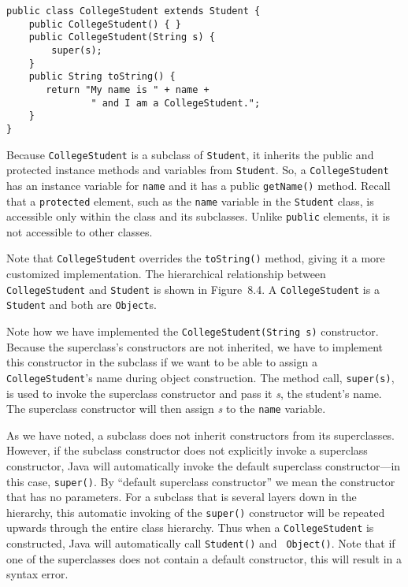 \begin{jjjlisting}
\begin{lstlisting}
public class CollegeStudent extends Student {
    public CollegeStudent() { }
    public CollegeStudent(String s) {
        super(s);
    }
    public String toString() {
       return "My name is " + name +  
               " and I am a CollegeStudent.";
    }
}
\end{lstlisting}
\end{jjjlisting}

\noindent Because {\tt CollegeStudent} is a subclass of {\tt Student},
it inherits the public and protected instance methods and variables
from {\tt Student}. So, a {\tt CollegeStudent} has an instance
variable for {\tt name} and it has a public {\tt getName()}
method. Recall that a {\tt protected} element, such as the {\tt name}
variable in the {\tt Student} class, is accessible only within the
class and its subclasses. Unlike {\tt public} elements, it is not
accessible to other classes.

Note that {\tt CollegeStudent} overrides the {\tt toString()} method,
giving it a more customized implementation.  The hierarchical
relationship between {\tt CollegeStudent} and {\tt Student} is shown
in Figure~8.4.  A {\tt CollegeStudent} is a {\tt Student} and both
are {\tt Object}s. 

Note how we have implemented the {\tt CollegeStudent(String s)}
constructor. Because the superclass's constructors are not inherited,
we have to implement this constructor in the subclass if we want to be
able to assign a {\tt CollegeStudent}'s name during object
construction.  The method call, {\tt super(s)}, is used to invoke the
superclass constructor and pass it {\em s}, the student's name. The
superclass constructor will then assign {\em s} to the {\tt name}
variable.

As we have noted, a subclass does not inherit constructors from its
 superclasses.  However, if the
subclass constructor does not explicitly invoke a superclass
constructor, Java will automatically invoke the default superclass
constructor---in this case, {\tt super()}.  By ``default superclass
constructor'' we mean the constructor that has no parameters.  For a
subclass that is several layers down in the hierarchy, this automatic
invoking of the {\tt super()} constructor will be repeated upwards
through the entire class hierarchy.  Thus when a {\tt CollegeStudent}
is constructed, Java will automatically call {\tt Student()} and {\tt
Object()}.  Note that if one of the superclasses does not contain a
default constructor, this will result in a syntax error.

